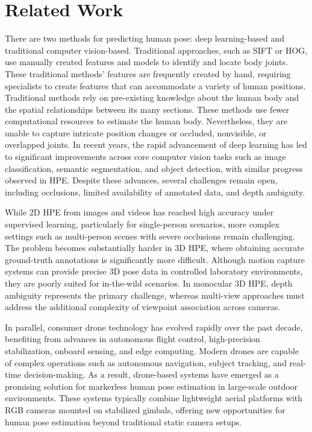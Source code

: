 \chapter{Related Work}
There are two methods for predicting human pose: deep learning-based and traditional computer vision-based. Traditional approaches, such as SIFT \cite{lowe1999object} 
or HOG, use manually created features and models to identify and locate body joints. These traditional methods' features are frequently created by hand, requiring 
specialists to create features that can accommodate a variety of human positions. Traditional methods rely on pre-existing knowledge about the human body and the 
spatial relationships between its many sections. These methods use fewer computational resources to estimate the human body. Nevertheless, they are unable to capture 
intricate position changes or occluded, nonvisible, or overlapped joints.
In recent years, the rapid advancement of deep learning has led to significant improvements across core computer vision tasks such as image classification, semantic 
segmentation, and object detection, with similar progress observed in HPE. Despite these advances, several challenges remain open, including occlusions, limited 
availability of annotated data, and depth ambiguity.

While 2D HPE from images and videos has reached high accuracy under supervised learning, particularly for single-person scenarios, more complex settings such as 
multi-person scenes with severe occlusions remain challenging. The problem becomes substantially harder in 3D HPE, where obtaining accurate ground-truth annotations is 
significantly more difficult. Although motion capture systems can provide precise 3D pose data in controlled laboratory environments, they are poorly suited for 
in-the-wild scenarios. In monocular 3D HPE, depth ambiguity represents the primary challenge, whereas multi-view approaches must address the additional complexity of 
viewpoint association across cameras.

In parallel, consumer drone technology has evolved rapidly over the past decade, benefiting from advances in autonomous flight control, high-precision 
stabilization, onboard sensing, and edge computing. Modern drones are capable of complex operations such as autonomous navigation, subject tracking, and 
real-time decision-making. As a result, drone-based systems have emerged as a promising solution for markerless human pose estimation in large-scale 
outdoor environments. These systems typically combine lightweight aerial platforms with RGB cameras mounted on stabilized gimbals, offering new opportunities for human 
pose estimation beyond traditional static camera setups.

